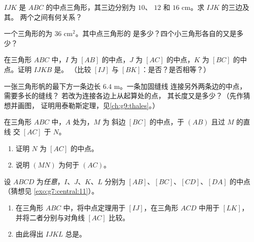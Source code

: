 \begin{exercise}[$\star$]\label{exo:g8:midpoints:4}
$IJK$ 是 $ABC$ 的中点三角形，其三边分别为 $10$、
$12$ 和 $16$ cm。求 $IJK$ 的三边及其。
两个之间有何关系？
\end{exercise}

\begin{exercise}[$\star$]\label{exo:g8:midpoints:5}
一个三角形的为 $36$ cm$^2$。其中点三角形的
是多少？四个小三角形各自的又是多少？
\end{exercise}

\begin{exercise}[$\star\star$]\label{exo:g8:midpoints:6}
在三角形 $ABC$ 中，$I$ 为 $[AB]$ 的中点，$J$ 为
$[AC]$ 的中点，$K$ 为 $[BC]$ 的中点。证明 $IJKB$ 是。
（比较 $[IJ]$ 与 $[BK]$：是否？是否相等？）
\end{exercise}

\begin{exercise}[$\star\star$]\label{exo:g8:midpoints:7}
一张三角形帆的最下方一条边长 $6.4$ m。一条加固缝线
连接另外两条边的中点，需要多长的缝线？
若改为连接各边上从起算处的点，
其长度又是多少？（先作猜想并画图，
证明用泰勒斯定理，见\cref{ch:g9:thales}。）
\end{exercise}

\begin{exercise}[$\star\star$]\label{exo:g8:midpoints:8}
在三角形 $ABC$ 中，$A$ 处为，$M$ 为
斜边 $[BC]$ 的中点，于 $(AB)$ 且过 $M$ 的直线
交 $[AC]$ 于 $N$。
\begin{enumerate}
  \item 证明 $N$ 为 $[AC]$ 的中点。
  \item 说明 $(MN)$ 为何于 $(AC)$。
\end{enumerate}
\end{exercise}

\begin{exercise}[$\star\star\star$]\label{exo:g8:midpoints:9}
设 $ABCD$ 为\emph{任意}，$I$、$J$、$K$、$L$ 分别为
$[AB]$、$[BC]$、$[CD]$、$[DA]$ 的中点（猜想见
\cref{exo:g7:central:11}）。
\begin{enumerate}
  \item 在三角形 $ABC$ 中，将中点定理用于
        $[IJ]$，在三角形 $ACD$ 中用于 $[LK]$，
        并将二者分别与对角线 $[AC]$ 比较。
  \item 由此得出 $IJKL$ 总是。
\end{enumerate}
\end{exercise}

